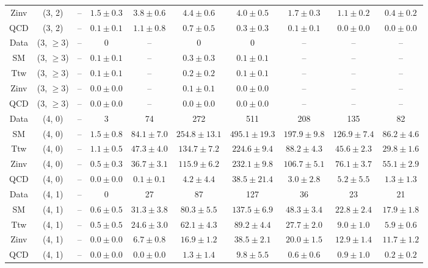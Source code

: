 \begin{table}[h!]
{\begin{tabular}{cccccccccc}
	Zinv & (3, 2) & -- & $1.5\pm 0.3$ & $3.8\pm 0.6$ & $4.4\pm 0.6$ & $4.0\pm 0.5$ & $1.7\pm 0.3$ & $1.1\pm 0.2$ & $0.4\pm 0.2$ \\[0.5ex] 
	QCD & (3, 2) & -- & $0.1\pm 0.1$ & $1.1\pm 0.8$ & $0.7\pm 0.5$ & $0.3\pm 0.3$ & $0.1\pm 0.1$ & $0.0\pm 0.0$ & $0.0\pm 0.0$ \\[0.5ex] 
	Data & (3, $\ge3$) & -- & 0 & -- & 0 & 0 & -- & -- & -- \\[0.5ex] 
	SM & (3, $\ge3$) & -- & $0.1\pm 0.1$ & -- & $0.3\pm 0.3$ & $0.1\pm 0.1$ & -- & -- & -- \\[0.5ex] 
	Ttw & (3, $\ge3$) & -- & $0.1\pm 0.1$ & -- & $0.2\pm 0.2$ & $0.1\pm 0.1$ & -- & -- & -- \\[0.5ex] 
	Zinv & (3, $\ge3$) & -- & $0.0\pm 0.0$ & -- & $0.1\pm 0.1$ & $0.0\pm 0.0$ & -- & -- & -- \\[0.5ex] 
	QCD & (3, $\ge3$) & -- & $0.0\pm 0.0$ & -- & $0.0\pm 0.0$ & $0.0\pm 0.0$ & -- & -- & -- \\[0.5ex] 
	Data & (4, 0) & -- & 3 & 74 & 272 & 511 & 208 & 135 & 82 \\[0.5ex] 
	SM & (4, 0) & -- & $1.5\pm 0.8$ & $84.1\pm 7.0$ & $254.8\pm 13.1$ & $495.1\pm 19.3$ & $197.9\pm 9.8$ & $126.9\pm 7.4$ & $86.2\pm 4.6$ \\[0.5ex] 
	Ttw & (4, 0) & -- & $1.1\pm 0.5$ & $47.3\pm 4.0$ & $134.7\pm 7.2$ & $224.6\pm 9.4$ & $88.2\pm 4.3$ & $45.6\pm 2.3$ & $29.8\pm 1.6$ \\[0.5ex] 
	Zinv & (4, 0) & -- & $0.5\pm 0.3$ & $36.7\pm 3.1$ & $115.9\pm 6.2$ & $232.1\pm 9.8$ & $106.7\pm 5.1$ & $76.1\pm 3.7$ & $55.1\pm 2.9$ \\[0.5ex] 
	QCD & (4, 0) & -- & $0.0\pm 0.0$ & $0.1\pm 0.1$ & $4.2\pm 4.4$ & $38.5\pm 21.4$ & $3.0\pm 2.8$ & $5.2\pm 5.5$ & $1.3\pm 1.3$ \\[0.5ex] 
	Data & (4, 1) & -- & 0 & 27 & 87 & 127 & 36 & 23 & 21 \\[0.5ex] 
	SM & (4, 1) & -- & $0.6\pm 0.5$ & $31.3\pm 3.8$ & $80.3\pm 5.5$ & $137.5\pm 6.9$ & $48.3\pm 3.4$ & $22.8\pm 2.4$ & $17.9\pm 1.8$ \\[0.5ex] 
	Ttw & (4, 1) & -- & $0.5\pm 0.5$ & $24.6\pm 3.0$ & $62.1\pm 4.3$ & $89.2\pm 4.4$ & $27.7\pm 2.0$ & $9.0\pm 1.0$ & $5.9\pm 0.6$ \\[0.5ex] 
	Zinv & (4, 1) & -- & $0.0\pm 0.0$ & $6.7\pm 0.8$ & $16.9\pm 1.2$ & $38.5\pm 2.1$ & $20.0\pm 1.5$ & $12.9\pm 1.4$ & $11.7\pm 1.2$ \\[0.5ex] 
	QCD & (4, 1) & -- & $0.0\pm 0.0$ & $0.0\pm 0.0$ & $1.3\pm 1.4$ & $9.8\pm 5.5$ & $0.6\pm 0.6$ & $0.9\pm 1.0$ & $0.2\pm 0.2$ \\[0.5ex] 

\end{tabular}}
\end{table}

